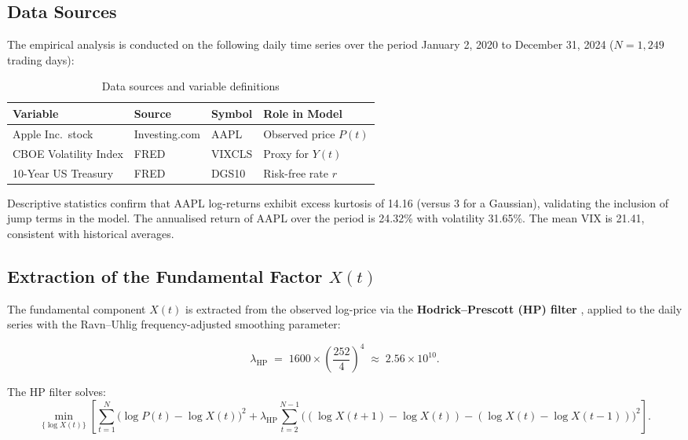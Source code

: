\documentclass[12pt,a4paper]{article}
\theoremstyle{definition}
\theoremstyle{remark}
\begin{document}
\subsection{Data Sources}

The empirical analysis is conducted on the following daily time series
over the period January 2, 2020 to December 31, 2024 ($N = 1{,}249$
trading days):

\begin{table}[H]
  \centering
  \caption{Data sources and variable definitions}
  \label{tab:data}
  \begin{tabular}{llll}
    \toprule
    Variable & Source & Symbol & Role in Model \\
    \midrule
    Apple Inc.\ stock & Investing.com & AAPL & Observed price $P(t)$ \\
    CBOE Volatility Index & FRED & VIXCLS & Proxy for $Y(t)$ \\
    10-Year US Treasury & FRED & DGS10 & Risk-free rate $r$ \\
    \bottomrule
  \end{tabular}
\end{table}

\noindent Descriptive statistics confirm that AAPL log-returns exhibit
excess kurtosis of 14.16 (versus 3 for a Gaussian), validating the
inclusion of jump terms in the model. The annualised return of AAPL
over the period is 24.32\% with volatility 31.65\%. The mean VIX is
21.41, consistent with historical averages.

\subsection{Extraction of the Fundamental Factor $X(t)$}

The fundamental component $X(t)$ is extracted from the observed log-price
via the \textbf{Hodrick--Prescott (HP) filter} \citep{hodrickprescott},
applied to the daily series with the Ravn--Uhlig frequency-adjusted
smoothing parameter:

\begin{equation}
  \lambda_{\mathrm{HP}} \;=\; 1600 \times \left(\frac{252}{4}\right)^4
  \;\approx\; 2.56 \times 10^{10}.
\end{equation}

The HP filter solves:
\begin{equation}
  \min_{\{\log X(t)\}} \left[
    \sum_{t=1}^N \bigl(\log P(t) - \log X(t)\bigr)^2
    + \lambda_{\mathrm{HP}} \sum_{t=2}^{N-1}
      \bigl((\log X(t+1) - \log X(t)) - (\log X(t) - \log X(t-1))\bigr)^2
  \right].
\end{equation}
\end{document}
